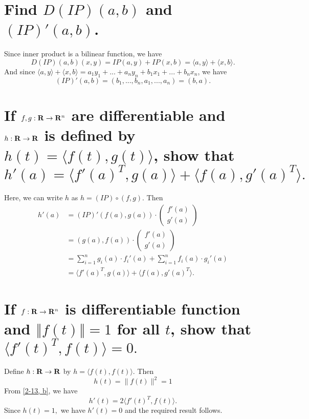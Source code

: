 \begin{parts}
    \part{
        Find $D(IP)(a,b)$ and $(IP)'(a,b)$.
    }
    \begin{solution}
        Since inner product is a bilinear
        function, we have
        $$D(IP)(a,b)(x,y)=IP(a,y)+IP(x,b)
        =\langle a,y\rangle
        +\langle x,b\rangle.
        $$
        And since $\langle a,y\rangle
        +\langle x,b\rangle=
        a_1y_1+...+a_ny_n+b_1x_1+
        ...+b_nx_n$, we have
        $$(IP)'(a,b)=(b_1,...,b_n,
        a_1,...,a_n)=(b,a).$$
    \end{solution}
    \part{
        \label{2-13, b}
        If $f,g:\mathbf{R}\to\mathbf{R}^n$ are
        differentiable
        and $h:\mathbf{R}\to\mathbf{R}$ is defined by
        $h(t)=\langle f(t),g(t)\rangle$,
        show that
        $$h'(a)=\langle f'(a)^T,g(a)\rangle
        +\langle f(a),g'(a)^T\rangle.$$
    }
    \begin{solution}
        Here, we can write $h$ as
        $h=(IP)\circ(f, g)$. Then
        \begin{align*}
            h'(a)&= (IP)'(f(a),g(a))\cdot
            \left(\begin{matrix}
                f'(a)\\g'(a)
            \end{matrix}\right)\\
            &=(g(a),f(a))\cdot
            \left(\begin{matrix}
                f'(a)\\g'(a)
            \end{matrix}\right)\\
            &=\sum_{i=1}^n
            {g_i(a)\cdot f_i'(a)}+
            \sum_{i=1}^n
            {f_i(a)\cdot g_i'(a)}\\
            &=\langle f'(a)^T,g(a)\rangle
            +\langle f(a),g'(a)^T\rangle.
        \end{align*}
    \end{solution}
    \part{
        If $f:\mathbf{R}\to\mathbf{R}^n$ is differentiable
        function and $\left\Vert f(t)
        \right\Vert=1$ for all $t$, show
        that $\langle f'(t)^T,f(t)
        \rangle = 0.$
    }
    \begin{solution}
        Define $h:\mathbf{R}\to\mathbf{R}$ by $h=\langle
        f(t),f(t)\rangle.$ Then
        $$h(t)=\lVert f(t)\rVert ^2=1$$
        From \ref{2-13, b}, we have
        $$h'(t)=2\langle f'(t)^T,f(t)
        \rangle.$$
        Since $h(t)=1,$ we have
        $ h'(t)=0$ and the
        required result follows.
    \end{solution}

\end{parts}
